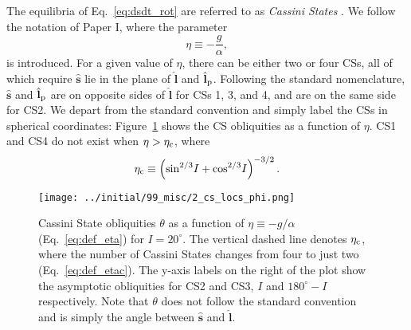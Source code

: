\documentclass[
        fleqn,
        usenatbib,
        referee,
    ]{mnras}
\newcommand*{\p}[1]{\left(#1\right)}
\newcommand*{\uv}[1]{\hat{\boldsymbol{\mathbf{#1}}}}
\newlength{\colummwidth}
\begin{document}
The equilibria of Eq.~\eqref{eq:dsdt_rot} are referred to as \emph{Cassini
States} \citep[CSs;][]{colombo1966, peale1969}. We follow the notation of
Paper I, where the parameter
\begin{equation}
    \eta \equiv -\frac{g}{\alpha},\label{eq:def_eta}
\end{equation}
is introduced. For a given value of $\eta$, there can be either two or four CSs,
all of which require $\uv{s}$ lie in the plane of $\uv{l}$ and $\uv{l}_{\rm p}$.
Following the standard nomenclature, $\uv{s}$ and $\uv{l}_{\rm p}$ are on
opposite sides of $\uv{l}$ for CSs 1, 3, and 4, and are on the same side for
CS2. We depart from the standard convention and simply label the CSs in
spherical coordinates: Figure~\ref{fig:cs_locs} shows the CS obliquities as a
function of $\eta$. CS1 and CS4 do not exist when $\eta > \eta_{\rm c}$, where
\begin{equation}
    \eta_{\rm c} \equiv \p{\sin^{2/3}\!I + \cos^{2/3}\!I}^{-3/2}.
        \label{eq:def_etac}
\end{equation}
\begin{figure}
    \centering
    \texttt{[image: ../initial/99\_misc/2\_cs\_locs\_phi.png]}
    \caption{Cassini State obliquities $\theta$ as a function of $\eta \equiv
    -g/\alpha$ (Eq.~\ref{eq:def_eta}) for $I = 20^\circ$. The vertical dashed
    line denotes $\eta_{\rm c}$, where the number of Cassini States changes from
    four to just two (Eq.~\ref{eq:def_etac}). The y-axis labels on the right of
    the plot show the asymptotic obliquities for CS2 and CS3, $I$ and $180^\circ
    - I$ respectively. Note that $\theta$ does not follow the standard
    convention \citep[e.g.][]{colombo1966} and is simply the angle between
    $\uv{s}$ and $\uv{l}$.}\label{fig:cs_locs}
\end{figure}
\end{document}
